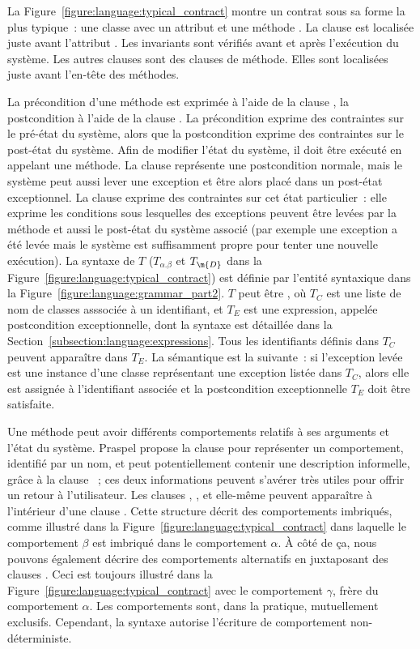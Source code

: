 La Figure~\ref{figure:language:typical_contract} montre un contrat sous sa forme
la plus typique~: une classe  avec un attribut  et une méthode
. La clause \ainvariant est localisée juste avant l'attribut .
Les invariants sont vérifiés avant et après l'exécution du système. Les autres
clauses sont des clauses de méthode. Elles sont localisées juste avant l'en-tête
des méthodes.

La précondition d'une méthode est exprimée à l'aide de la clause \arequires, la
postcondition à l'aide de la clause \aensures. La précondition exprime des
contraintes sur le {\strong pré-état} du système, alors que la postcondition
exprime des contraintes sur le {\strong post-état} du système. Afin de modifier
l'état du système, il doit être exécuté en appelant une méthode. La clause
\aensures représente une {\strong postcondition normale}, mais le système peut
aussi lever une exception et être alors placé dans un {\strong post-état
exceptionnel}. La clause \athrowable exprime des contraintes sur cet état
particulier~: elle exprime les conditions sous lesquelles des exceptions peuvent
être levées par la méthode et aussi le post-état du système associé (par exemple
une exception a été levée mais le système est suffisamment propre pour tenter
une nouvelle exécution). La syntaxe de $T$ ($T_{\alpha.\beta}$ et $T_\m{D}$ dans
la Figure~\ref{figure:language:typical_contract}) est définie par l'entité
syntaxique  dans la
Figure~\ref{figure:language:grammar_part2}. $T$ peut être , où $T_C$ est une liste de nom de classes asssociée à un identifiant, et
$T_E$ est une expression, appelée {\strong postcondition exceptionnelle}, dont
la syntaxe est détaillée dans la Section~\ref{subsection:language:expressions}.
Tous les identifiants définis dans $T_C$ peuvent apparaître dans $T_E$. La
sémantique est la suivante~: si l'exception levée est une instance d'une classe
représentant une exception listée dans $T_C$, alors elle est assignée à
l'identifiant associée et la postcondition exceptionnelle $T_E$ doit être
satisfaite.

Une méthode peut avoir différents {\strong comportements} relatifs à ses
arguments et l'état du système. Praspel propose la clause \abehavior pour
représenter un comportement, identifié par un nom, et peut potentiellement
contenir une description informelle, grâce à la clause \adescription~; ces deux
informations peuvent s'avérer très utiles pour offrir un retour à l'utilisateur.
Les clauses \arequires, \aensures, \athrowable et \abehavior elle-même peuvent
apparaître à l'intérieur d'une clause \abehavior. Cette structure décrit des
comportements {\strong imbriqués}, comme illustré dans la
Figure~\ref{figure:language:typical_contract} dans laquelle le comportement
$\beta$ est imbriqué dans le comportement $\alpha$. À côté de ça, nous pouvons
également décrire des comportements {\strong alternatifs} en juxtaposant des
clauses \abehavior. Ceci est toujours illustré dans la
Figure~\ref{figure:language:typical_contract} avec le comportement $\gamma$,
frère du comportement $\alpha$. Les comportements sont, dans la pratique,
{\strong mutuellement exclusifs}. Cependant, la syntaxe autorise l'écriture de
comportement non-déterministe.

